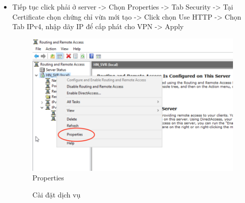 \begin{itemize}
    \item Tiếp tục click phải ở server -> Chọn Properties -> Tab Security -> Tại Certificate chọn chứng chỉ vừa mới tạo -> Click chọn Use HTTP ->  Chọn Tab IPv4, nhập dãy IP để cấp phát cho VPN -> Apply
\newpage
    \begin{figure}[htbp]
            \centering
            \includegraphics[width=0.5\linewidth]{SiteToSiteImg/conf3.png}
            \caption{Properties}
        \end{figure}
    
    \begin{figure}[htbp]
            \hfill
            \hfill
            \caption{Cài đặt dịch vụ}
        \end{figure}
        

\end{itemize}
